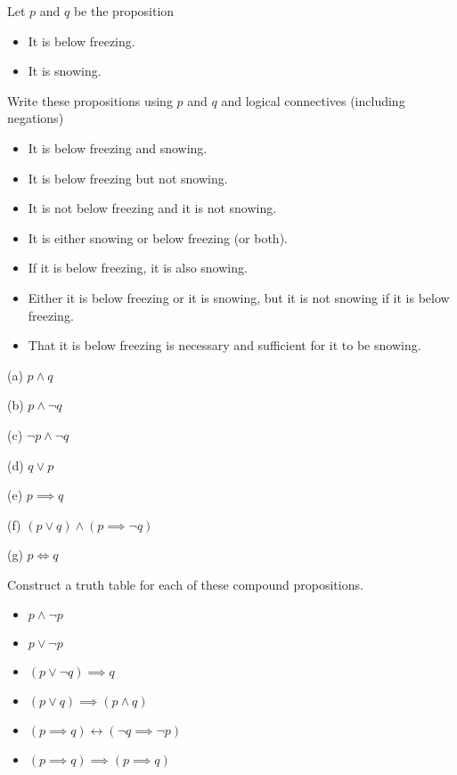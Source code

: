 \documentclass[addpoints]{exam}
\newenvironment{problem}[2][Problem]{\begin{trivlist}
    \item[\hskip \labelsep {\bfseries #1}\hskip \labelsep {\bfseries #2.}]}{\end{trivlist}}
\begin{document}
\begin{problem}{2}
Let $p$ and $q$ be the proposition
\begin{itemize}
    \item[$p:$] It is below freezing.
    \item[$q:$] It is snowing.
\end{itemize}

Write these propositions using $p$ and $q$ and logical connectives (including negations)

\begin{itemize}
    \item [(a)] It is below freezing and snowing.
    \item [(b)] It is below freezing but not snowing.
    \item [(c)] It is not below freezing and it is not snowing.
    \item [(d)] It is either snowing or below freezing (or both).
    \item [(e)] If it is below freezing, it is also snowing.
    \item [(f)] Either it is below freezing or it is snowing, but it is
          not snowing if it is below freezing.
    \item [(g)] That it is below freezing is necessary and sufficient
          for it to be snowing.
\end{itemize}

\end{problem}

\begin{questions}
    \question
    \begin{solution}
        
        (a) $ p \land q $

        (b) $ p \land \neg q $

        (c) $ \neg p \land \neg q $ 

        (d) $ q \lor p $

        (e) $ p \implies q $

        (f) $ (p \lor q) \land (p \implies \neg q)$

        (g) $ p \iff q $
    \end{solution}
\end{questions}

\begin{problem}{3}
Construct a truth table for each of these compound propositions.
\begin{itemize}
    \item[(a)] $ p \land \neg p$
    \item[(b)] $ p \lor \neg p$
    \item[(c)] $ (p \lor \neg q) \implies  q$
    \item[(d)] $ (p \lor q) \implies (p \land q) $
    \item[(e)] $ (p \implies q) \leftrightarrow (\neg q \implies \neg p) $
    \item[(f)] $ (p \implies q) \implies (p \implies q) $
\end{itemize}

\end{problem}
\end{document}
